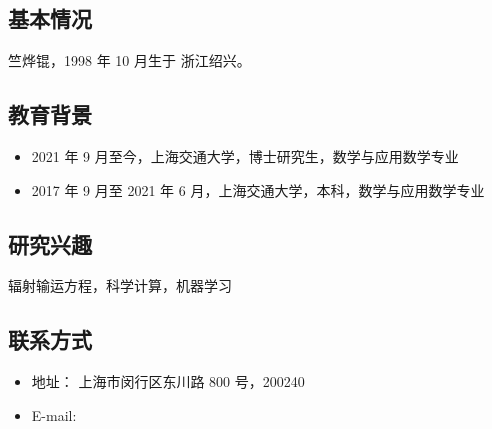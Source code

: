 
\begin{resume}
    \subsection*{基本情况}
    竺烨锟，1998 年 10 月生于 浙江绍兴。

    \subsection*{教育背景}
    \begin{itemize}
        \item 2021 年 9 月至今，上海交通大学，博士研究生，数学与应用数学专业
        \item 2017 年 9 月至 2021 年 6 月，上海交通大学，本科，数学与应用数学专业
    \end{itemize}

    \subsection*{研究兴趣}
    辐射输运方程，科学计算，机器学习

    \subsection*{联系方式}
    \begin{itemize}
        \item 地址： 上海市闵行区东川路 800 号，200240
        \item E-mail: 
    \end{itemize}
\end{resume}